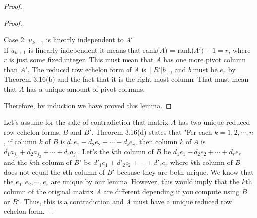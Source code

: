 \documentclass[11pt]{scrartcl}
\begin{document}
\begin{proof}
\begin{lemma}
\begin{proof}
\begin{enumerate}[label=\alph*.]
{					Case 2: $u_{k+1}$ is linearly independent to $A'$\\
					If $u_{k+1}$ is linearly independent it means that rank($A$) = rank($A') + 1 = r$, where $r$ is just some fixed integer. 
					This must mean that $A$ has one more pivot column than $A'$. The reduced row echelon form of $A$ is 
					$[R'|b]$, and $b$ must be $e_r$	by Theorem 3.16(b) and the fact that it is the right most column.
					That must mean that $A$ has a unique amount of pivot columns.
				}
			\end{enumerate}
			Therefore, by induction we have proved this lemma.
			\end{proof}
	\end{lemma}
Let's assume for the sake of contradiction that matrix $A$ has two unique reduced row echelon forms, $B$ and $B'$.
Theorem 3.16(d) states that "For each $k = 1, 2, \cdots, n$, if column $k$ of $B$ is $d_1e_1 + d_2e_2 + \cdots + d_re_r $, 
then column $k$ of $A$ is $d_1a_{j_1} + d_2a_{j_2} + \cdots + d_ra_{j_r}$. Let's the $k$th column of $B$ be $d_1e_1 + d_2e_2 + \cdots + d_re_r$
and the $k$th column of $B'$ be $d'_1e_1 + d'_2e_2 + \cdots + d'_re_r$ where $k$th column of $B$ does not equal the $k$th column of $B'$ because they are both unique.
We know that the $e_1, e_2, \cdots, e_r$ are unique by our lemma.
However, this would imply that the $k$th column of the original matrix $A$ are different depending if you compute using $B$ or $B'$. Thus, this is a contradiction
and $A$ must have a unique reduced row echelon form. 
\end{proof}
\end{document}

